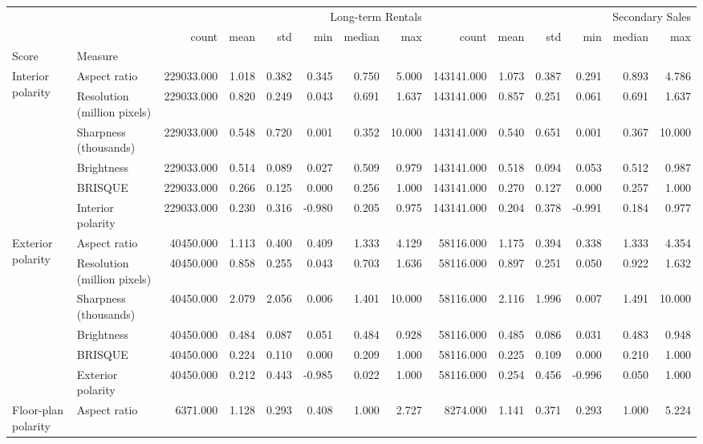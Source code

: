 \begin{tabular}{llrrrrrrrrrrrr}
\toprule
 &  & \multicolumn{6}{r}{Long-term Rentals} & \multicolumn{6}{r}{Secondary Sales} \\
 &  & count & mean & std & min & median & max & count & mean & std & min & median & max \\
Score & Measure &  &  &  &  &  &  &  &  &  &  &  &  \\
\midrule
\multirow[t]{6}{*}{Interior polarity} & Aspect ratio & 229033.000 & 1.018 & 0.382 & 0.345 & 0.750 & 5.000 & 143141.000 & 1.073 & 0.387 & 0.291 & 0.893 & 4.786 \\
 & Resolution (million pixels) & 229033.000 & 0.820 & 0.249 & 0.043 & 0.691 & 1.637 & 143141.000 & 0.857 & 0.251 & 0.061 & 0.691 & 1.637 \\
 & Sharpness (thousands) & 229033.000 & 0.548 & 0.720 & 0.001 & 0.352 & 10.000 & 143141.000 & 0.540 & 0.651 & 0.001 & 0.367 & 10.000 \\
 & Brightness & 229033.000 & 0.514 & 0.089 & 0.027 & 0.509 & 0.979 & 143141.000 & 0.518 & 0.094 & 0.053 & 0.512 & 0.987 \\
 & BRISQUE & 229033.000 & 0.266 & 0.125 & 0.000 & 0.256 & 1.000 & 143141.000 & 0.270 & 0.127 & 0.000 & 0.257 & 1.000 \\
 & Interior polarity & 229033.000 & 0.230 & 0.316 & -0.980 & 0.205 & 0.975 & 143141.000 & 0.204 & 0.378 & -0.991 & 0.184 & 0.977 \\
\cline{1-14}
\multirow[t]{6}{*}{Exterior polarity} & Aspect ratio & 40450.000 & 1.113 & 0.400 & 0.409 & 1.333 & 4.129 & 58116.000 & 1.175 & 0.394 & 0.338 & 1.333 & 4.354 \\
 & Resolution (million pixels) & 40450.000 & 0.858 & 0.255 & 0.043 & 0.703 & 1.636 & 58116.000 & 0.897 & 0.251 & 0.050 & 0.922 & 1.632 \\
 & Sharpness (thousands) & 40450.000 & 2.079 & 2.056 & 0.006 & 1.401 & 10.000 & 58116.000 & 2.116 & 1.996 & 0.007 & 1.491 & 10.000 \\
 & Brightness & 40450.000 & 0.484 & 0.087 & 0.051 & 0.484 & 0.928 & 58116.000 & 0.485 & 0.086 & 0.031 & 0.483 & 0.948 \\
 & BRISQUE & 40450.000 & 0.224 & 0.110 & 0.000 & 0.209 & 1.000 & 58116.000 & 0.225 & 0.109 & 0.000 & 0.210 & 1.000 \\
 & Exterior polarity & 40450.000 & 0.212 & 0.443 & -0.985 & 0.022 & 1.000 & 58116.000 & 0.254 & 0.456 & -0.996 & 0.050 & 1.000 \\
\cline{1-14}
\multirow[t]{6}{*}{Floor-plan polarity} & Aspect ratio & 6371.000 & 1.128 & 0.293 & 0.408 & 1.000 & 2.727 & 8274.000 & 1.141 & 0.371 & 0.293 & 1.000 & 5.224 \\

\end{tabular}
